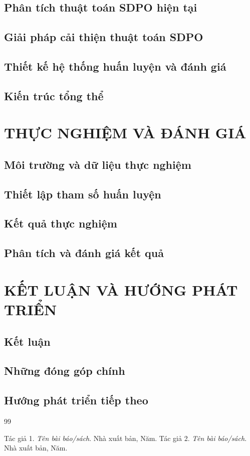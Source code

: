 \documentclass[12pt,a4paper]{report}
\begin{document}
\section{Phân tích thuật toán SDPO hiện tại}
\section{Giải pháp cải thiện thuật toán SDPO}
\section{Thiết kế hệ thống huấn luyện và đánh giá}
\section{Kiến trúc tổng thể}

\chapter{THỰC NGHIỆM VÀ ĐÁNH GIÁ}
\section{Môi trường và dữ liệu thực nghiệm}
\section{Thiết lập tham số huấn luyện}
\section{Kết quả thực nghiệm}
\section{Phân tích và đánh giá kết quả}

\chapter{KẾT LUẬN VÀ HƯỚNG PHÁT TRIỂN}
\section{Kết luận}
\section{Những đóng góp chính}
\section{Hướng phát triển tiếp theo}

\begin{thebibliography}{99}
Tác giả 1. \textit{Tên bài báo/sách}. Nhà xuất bản, Năm.
Tác giả 2. \textit{Tên bài báo/sách}. Nhà xuất bản, Năm.
\end{thebibliography}
\end{document}
